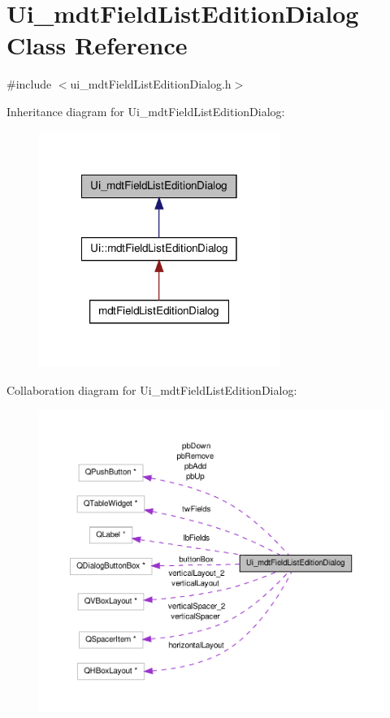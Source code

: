 \hypertarget{class_ui__mdt_field_list_edition_dialog}{\section{Ui\-\_\-mdt\-Field\-List\-Edition\-Dialog Class Reference}
\label{class_ui__mdt_field_list_edition_dialog}
}


{\ttfamily \#include $<$ui\-\_\-mdt\-Field\-List\-Edition\-Dialog.\-h$>$}



Inheritance diagram for Ui\-\_\-mdt\-Field\-List\-Edition\-Dialog\-:\nopagebreak
\begin{figure}[H]
\begin{center}
\leavevmode
\includegraphics[width=222pt]{class_ui__mdt_field_list_edition_dialog__inherit__graph}
\end{center}
\end{figure}


Collaboration diagram for Ui\-\_\-mdt\-Field\-List\-Edition\-Dialog\-:\nopagebreak
\begin{figure}[H]
\begin{center}
\leavevmode
\includegraphics[width=350pt]{class_ui__mdt_field_list_edition_dialog__coll__graph}
\end{center}
\end{figure}
